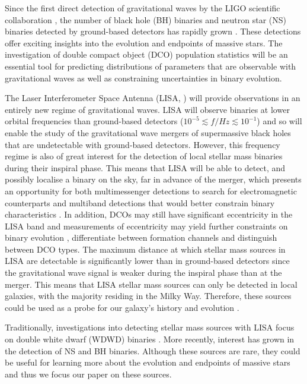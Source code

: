 Since the first direct detection of gravitational waves by the LIGO scientific collaboration \citep{Abbott+2016_first_detection}, the number of black hole (BH) binaries and neutron star (NS) binaries detected by ground-based detectors has rapidly grown \citep{Abbott+2019_GWTC1,Abbott+2020_GWTC2}. These detections offer exciting insights into the evolution and endpoints of massive stars. The investigation of double compact object (DCO) population statistics will be an essential tool for predicting distributions of parameters that are observable with gravitational waves as well as constraining uncertainties in binary evolution. 

The Laser Interferometer Space Antenna (LISA, \citealp{Amaro-Seoane+2017}) will provide observations in an entirely new regime of gravitational waves. LISA will observe binaries at lower orbital frequencies than ground-based detectors ($10^{-5} \lesssim f / \unit{Hz} \lesssim 10^{-1}$) and so will enable the study of the gravitational wave mergers of supermassive black holes that are undetectable with ground-based detectors. However, this frequency regime is also of great interest for the detection of local stellar mass binaries during their inspiral phase. This means that LISA will be able to detect, and possibly localise a binary on the sky, far in advance of the merger, which presents an opportunity for both multimessenger detections to search for electromagnetic counterparts and multiband detections that would better constrain binary characteristics \citep[e.g.][]{Sesana+2016, Gerosa+2019}. In addition, DCOs may still have significant eccentricity in the LISA band and measurements of eccentricity may yield further constraints on binary evolution \citep[e.g.][]{Nelemans+2001, Breivik+2016, Antonini+2017, Rodriguez+2018}, differentiate between formation channels and distinguish between DCO types. The maximum distance at which stellar mass sources in LISA are detectable is significantly lower than in ground-based detectors since the gravitational wave signal is weaker during the inspiral phase than at the merger. This means that LISA stellar mass sources can only be detected in local galaxies, with the majority residing in the Milky Way. Therefore, these sources could be used as a probe for our galaxy's history and evolution \citep[e.g.][]{Korol+2019}.

Traditionally, investigations into detecting stellar mass sources with LISA focus on double white dwarf (WDWD) binaries \citep{Nelemans+2001,Ruiter+2010,Yu+2010,Nissanke+2012,Korol+2017,Lamberts+2018}. More recently, interest has grown in the detection of NS and BH binaries. Although these sources are rare, they could be useful for learning more about the evolution and endpoints of massive stars and thus we focus our paper on these sources.

